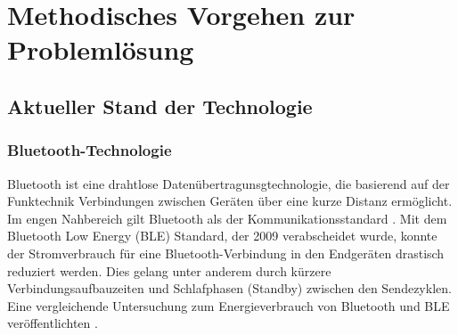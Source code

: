 \section{Methodisches Vorgehen zur Problemlösung}

\subsection{Aktueller Stand der Technologie}

\subsubsection{Bluetooth-Technologie}\label{sssec:BLE}
Bluetooth ist eine drahtlose Datenübertragunsgtechnologie, die basierend auf der Funktechnik Verbindungen zwischen Geräten über eine kurze Distanz ermöglicht. Im engen Nahbereich gilt Bluetooth als der Kommunikationsstandard \citep[Vgl.][S. 133]{mobil-sicher}. Mit dem Bluetooth Low Energy (BLE) Standard, der 2009 verabscheidet wurde, konnte der Stromverbrauch für eine Bluetooth-Verbindung in den Endgeräten drastisch reduziert werden. Dies gelang unter anderem durch kürzere Verbindungsaufbauzeiten und Schlafphasen (Standby) zwischen den Sendezyklen. Eine vergleichende Untersuchung zum Energieverbrauch von Bluetooth und BLE veröffentlichten \cite{ble-energy}. 


